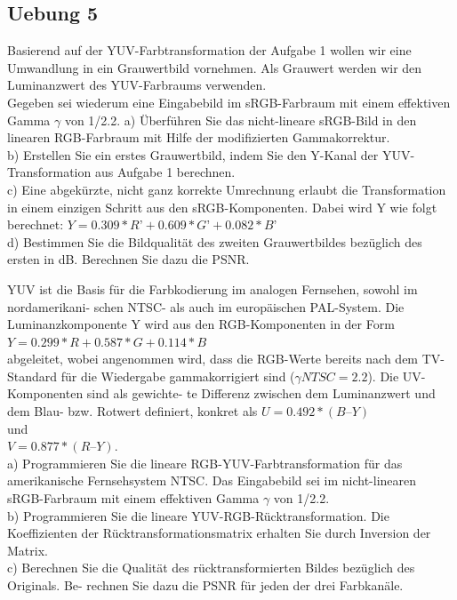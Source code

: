 \documentclass[10pt]{article}
\begin{document}
\subsection{Uebung 5}
Basierend auf der YUV-Farbtransformation der Aufgabe 1 wollen wir eine Umwandlung in ein
Grauwertbild vornehmen. Als Grauwert werden wir den Luminanzwert des YUV-Farbraums
verwenden.\\
Gegeben sei wiederum eine Eingabebild im sRGB-Farbraum mit einem effektiven Gamma $\gamma$ von 1/2.2.
a) Überführen Sie das nicht-lineare sRGB-Bild in den linearen RGB-Farbraum mit Hilfe der
modifizierten Gammakorrektur.\\
b) Erstellen Sie ein erstes Grauwertbild, indem Sie den Y-Kanal der YUV-Transformation
aus Aufgabe 1 berechnen.\\
c) Eine abgekürzte, nicht ganz korrekte Umrechnung erlaubt die Transformation in einem
einzigen Schritt aus den sRGB-Komponenten. Dabei wird Y wie folgt berechnet:
$Y = 0.309*R’ + 0.609*G’ + 0.082*B’$\\
d) Bestimmen Sie die Bildqualität des zweiten Grauwertbildes bezüglich des ersten in dB.
Berechnen Sie dazu die PSNR.

YUV ist die Basis für die Farbkodierung im analogen Fernsehen, sowohl im nordamerikani-
schen NTSC- als auch im europäischen PAL-System. Die Luminanzkomponente Y wird aus
den RGB-Komponenten in der Form\\
$Y = 0.299*R + 0.587*G + 0.114*B$\\
abgeleitet, wobei angenommen wird, dass die RGB-Werte bereits nach dem TV-Standard für
die Wiedergabe gammakorrigiert sind ($\gamma NTSC = 2.2$). Die UV-Komponenten sind als gewichte-
te Differenz zwischen dem Luminanzwert und dem Blau- bzw. Rotwert definiert, konkret als
$U = 0.492*(B – Y)$\\
 und\\
 $V = 0.877*(R – Y)$.\\
a) Programmieren Sie die lineare RGB-YUV-Farbtransformation für das amerikanische
Fernsehsystem NTSC. Das Eingabebild sei im nicht-linearen sRGB-Farbraum mit einem
effektiven Gamma $\gamma$ von 1/2.2.\\
b) Programmieren Sie die lineare YUV-RGB-Rücktransformation. Die Koeffizienten der
Rücktransformationsmatrix erhalten Sie durch Inversion der Matrix.\\
c) Berechnen Sie die Qualität des rücktransformierten Bildes bezüglich des Originals. Be-
rechnen Sie dazu die PSNR für jeden der drei Farbkanäle.

\end{document}
